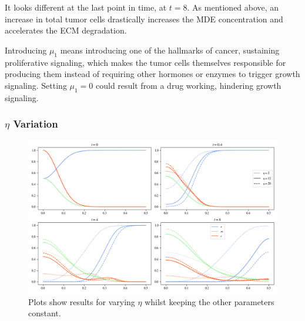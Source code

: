 It looks different at the last point in time, at $t=8$. As mentioned above, an increase in total tumor cells drastically increases the MDE concentration and accelerates the ECM degradation.

Introducing $\mu_1$ means introducing one of the hallmarks of cancer, sustaining proliferative signaling, which makes the tumor cells themselves responsible for producing them instead of requiring other hormones or enzymes to trigger growth signaling. Setting $\mu_1=0$ could result from a drug working, hindering growth signaling.

\subsubsection*{$\eta$ Variation}
\begin{figure}[h!]
    \centering
    \includegraphics[width=\textwidth]{resources/images/prolif_eta_variation.png}
    \caption{Plots show results for varying $\eta$ whilst keeping the other parameters constant.}
    \label{fig:prolif_eta_variation}
\end{figure}

